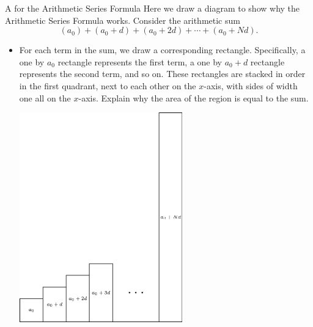 \begin{exercise}{A  for the Arithmetic Series Formula \Coffeecup \Coffeecup \Coffeecup}
Here we draw a diagram to show why the Arithmetic Series Formula works.  
Consider the arithmetic sum $$\left(a_0\right)+\left(a_0+d\right)+\left(a_0+2d\right)+\cdots+\left(a_0+Nd\right).$$
\begin{itemize}

\item For each term in the sum, we draw a corresponding rectangle.  Specifically, a one by $a_0$ rectangle represents the first term, a one by $a_0+d$ rectangle represents the second term, and so on.  These rectangles are stacked in order in the first quadrant, next to each other on the $x$-axis, with sides of width one all on the $x$-axis.  Explain why the area of the region is equal to the sum. 

	\begin{center}
		\includegraphics[width=200pt]{ChapterSeqSer/Figures/arithmetic.eps}
	\end{center}


\end{itemize}
\end{exercise}
